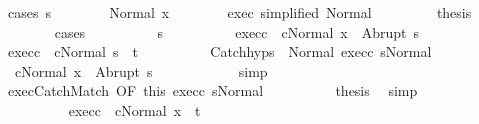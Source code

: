 \begin{isabellebody}
\ {\isacharparenleft}cases\ s{\isacharprime}{\isacharparenright}\isanewline
\ \ \ \ \ \ \isamarkupfalse%
\ {\isacharparenleft}Normal\ x{\isacharprime}{\isacharparenright}\isanewline
\ \ \ \ \ \ \isamarkupfalse%
\ exec{\isacharprime}\ {\isacharbrackleft}simplified\ Normal{\isacharbrackright}\ \isanewline
\ \ \ \ \ \ \isamarkupfalse%
\ {\isacharquery}thesis\isanewline
\ \ \ \ \ \ \isamarkupfalse%
\ {\isacharparenleft}cases{\isacharparenright}\isanewline
\ \ \ \ \ \ \ \ \isamarkupfalse%
\ s{\isacharprime}{\isacharprime}\isanewline
\ \ \ \ \ \ \ \ \isamarkupfalse%
\ exec{\isacharunderscore}c\ {\isachardoublequoteopen}{\isasymGamma}{\isasymturnstile}\ {\isasymlangle}cNormal\ x{\isacharprime}{\isasymrangle}\ {\isasymRightarrow}\ Abrupt\ s{\isacharprime}{\isacharprime}{\isachardoublequoteclose}\ \isanewline
\ \ \ \ \ \ \ \ \isamarkupfalse%
\ exec{\isacharunderscore}c\ {\isachardoublequoteopen}{\isasymGamma}{\isasymturnstile}\ {\isasymlangle}cNormal\ s{\isacharprime}{\isacharprime}{\isasymrangle}\ {\isasymRightarrow}\ t{\isachardoublequoteclose}\isanewline
\ \ \ \ \ \ \ \ \isamarkupfalse%
\ Catch{\isachardot}hyps\ {\isacharparenleft}{}{\isacharparenright}\ Normal\ exec{\isacharunderscore}c\ s{\isacharunderscore}Normal\isanewline
\ \ \ \ \ \ \ \ \isamarkupfalse%
\ {\isachardoublequoteopen}{\isasymGamma}{\isasymturnstile}\ {\isasymlangle}cNormal\ x{\isasymrangle}\ {\isasymRightarrow}\ Abrupt\ s{\isacharprime}{\isacharprime}{\isachardoublequoteclose}\isanewline
\ \ \ \ \ \ \ \ \ \ \isamarkupfalse%
\ simp\isanewline
\ \ \ \ \ \ \ \ \isamarkupfalse%
\ exec{\isachardot}CatchMatch\ {\isacharbrackleft}OF\ this\ exec{\isacharunderscore}c\ s{\isacharunderscore}Normal\isanewline
\ \ \ \ \ \ \ \ \isamarkupfalse%
\ {\isacharquery}thesis\ \isamarkupfalse%
\ simp\isanewline
\ \ \ \ \ \ \isamarkupfalse%
\isanewline
\ \ \ \ \ \ \ \ \isamarkupfalse%
\ exec{\isacharunderscore}c\ {\isachardoublequoteopen}{\isasymGamma}{\isasymturnstile}\ {\isasymlangle}cNormal\ x{\isacharprime}{\isasymrangle}\ {\isasymRightarrow}\ t{\isachardoublequoteclose}\ \isanewline

\end{isabellebody}

